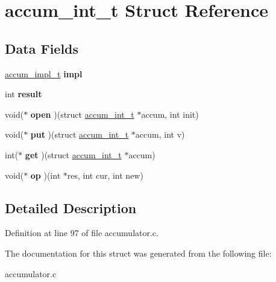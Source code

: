 \hypertarget{structaccum__int__t}{\section{accum\-\_\-int\-\_\-t Struct Reference}
\label{structaccum__int__t}
}
\subsection*{Data Fields}
\begin{DoxyCompactItemize}
\item 
\hypertarget{structaccum__int__t_a37c863bc3f1e1515f7854222f799678d}{\hyperlink{structaccum__impl__t}{accum\-\_\-impl\-\_\-t} {\bfseries impl}}\label{structaccum__int__t_a37c863bc3f1e1515f7854222f799678d}

\item 
\hypertarget{structaccum__int__t_a6b77fd0cdbd5aafd2d1d08260456437c}{int {\bfseries result}}\label{structaccum__int__t_a6b77fd0cdbd5aafd2d1d08260456437c}

\item 
\hypertarget{structaccum__int__t_a83819b8523021c4cfc6adbf3d1f65f3e}{void($\ast$ {\bfseries open} )(struct \hyperlink{structaccum__int__t}{accum\-\_\-int\-\_\-t} $\ast$accum, int init)}\label{structaccum__int__t_a83819b8523021c4cfc6adbf3d1f65f3e}

\item 
\hypertarget{structaccum__int__t_acb8fcc770cf013803b938832836298fe}{void($\ast$ {\bfseries put} )(struct \hyperlink{structaccum__int__t}{accum\-\_\-int\-\_\-t} $\ast$accum, int v)}\label{structaccum__int__t_acb8fcc770cf013803b938832836298fe}

\item 
\hypertarget{structaccum__int__t_aafc830fab7820b5cc68d731647786211}{int($\ast$ {\bfseries get} )(struct \hyperlink{structaccum__int__t}{accum\-\_\-int\-\_\-t} $\ast$accum)}\label{structaccum__int__t_aafc830fab7820b5cc68d731647786211}

\item 
\hypertarget{structaccum__int__t_a7f8418651a717895300c6c3afd6c12e8}{void($\ast$ {\bfseries op} )(int $\ast$res, int cur, int new)}\label{structaccum__int__t_a7f8418651a717895300c6c3afd6c12e8}

\end{DoxyCompactItemize}


\subsection{Detailed Description}


Definition at line 97 of file accumulator.\-c.



The documentation for this struct was generated from the following file\-:\begin{DoxyCompactItemize}
\item 
accumulator.\-c\end{DoxyCompactItemize}
